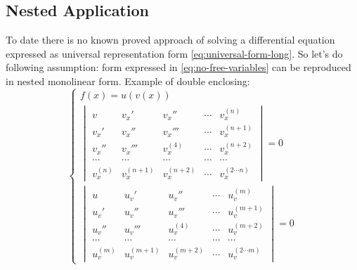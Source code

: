 \documentclass[a4paper, 11pt, oneside]{book}
\begin{document}
\subsection{Nested Application}\label{nested-application}
To date there is no known proved approach of solving a differential equation expressed as universal representation form \ref{eq:universal-form-long}. So let's do following assumption: form expressed in \ref{eq:no-free-variables} can be reproduced in nested monolinear form. Example of double enclosing:
\begin{equation}\label{eq:nested-monolinear-form-enclosing-example}
  \begin{cases}
    f(x) = u(v(x)) \\
    \begin{vmatrix}
      v & v_x' & v_x'' & \cdots & v_x^{(n)} \\
      v_x' & v_x'' & v_x''' & \cdots & v_x^{(n+1)} \\
      v_x'' & v_x''' & v_x^{(4)} & \cdots & v_x^{(n+2)} \\
      \cdots & \cdots & \cdots & \cdots & \cdots \\
      v_x^{(n)} & v_x^{(n+1)} & v_x^{(n+2)} & \cdots & v_x^{(2 \cdots n)}
    \end{vmatrix} = 0 \\
    \begin{vmatrix}
      u & u_v' & u_v'' & \cdots & u_v^{(m)} \\
      u_v' & u_v'' & u_v''' & \cdots & u_v^{(m+1)} \\
      u_v'' & u_v''' & u_v^{(4)} & \cdots & u_v^{(m+2)} \\
      \cdots & \cdots & \cdots & \cdots & \cdots \\
      u_v^{(m)} & u_v^{(m+1)} & u_v^{(m+2)} & \cdots & u_v^{(2 \cdots m)}
    \end{vmatrix} = 0
  \end{cases}
\end{equation}
\end{document}
